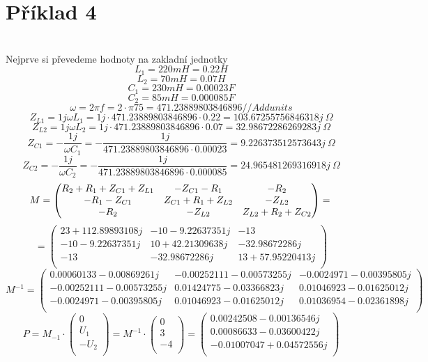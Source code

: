 \section{Příklad 4}
\\
Nejprve si převedeme hodnoty na zakladní jednotky\\
\[
  L_1 = 220 mH = 0.22 H
\]
\[
  L_2 = 70 mH = 0.07 H
\]
\[
  C_1 = 230 mH = 0.00023 F
\]
\[
  C_2 = 85 mH = 0.000085 F
\]
\[
  \omega = 2\pi f 
  = 2 \cdot \pi 75
  = 471.23889803846896 // Add units 
\]
\[
  Z_{L1} = 1j \omega L_1
  = 1j \cdot 471.23889803846896 \cdot 0.22 
  = 103.67255756846318j\ \Omega
\]
\[
  Z_{L2} = 1j \omega L_2
  = 1j \cdot 471.23889803846896 \cdot 0.07 
  = 32.98672286269283j \ \Omega
\]
\[
  Z_{C1} = -\displaystyle\frac{1j}{\omega C_1}
  = - \displaystyle\frac{1j}{471.23889803846896 \cdot 0.00023}
  = 9.226373512573643j\ \Omega
\]
\[
  Z_{C2} = -\displaystyle\frac{1j}{\omega C_2}
  = - \displaystyle\frac{1j}{471.23889803846896 \cdot 0.000085}
  = 24.965481269316918j\ \Omega
\]
\[
  M =
  \begin{pmatrix}
    R_2+R_1+Z_{C1}+Z_{L1} & -Z_{C1}-R_1 & -R_2\\
    -R_1-Z_{C1} & Z_{C1}+R_1+Z_{L2} & -Z_{L2}\\
    -R_2 & -Z_{L2} & Z_{L2}+R_2+Z_{C2}\\
  \end{pmatrix}
  =\\
\]
\[
  =
  \begin{pmatrix}
    23+112.89893108j & -10 -9.22637351j & -13\\
    -10 -9.22637351j & 10 +42.21309638j & -32.98672286j\\
    -13 & -32.98672286j & 13 +57.95220413j\\
  \end{pmatrix}
\]
\[
  M^{-1}
  =
  \begin{pmatrix}
    0.00060133-0.00869261j & -0.00252111-0.00573255j & -0.0024971 -0.00395805j\\
    -0.00252111-0.00573255j & 0.01424775-0.03366823j & 0.01046923-0.01625012j\\
    -0.0024971 -0.00395805j & 0.01046923-0.01625012j & 0.01036954-0.02361898j\\
  \end{pmatrix}
\]
\[
P = M_{-1} \cdot 
\begin{pmatrix}
  0\\
  U_1\\
  -U_2\\
\end{pmatrix}
= M^{-1}\cdot
\begin{pmatrix}
  0\\
  3\\
  -4\\
\end{pmatrix}
= 
\begin{pmatrix}
  0.00242508 -0.00136546j\\
  0.00086633 -0.03600422j\\
  -0.01007047 +0.04572556j\\
\end{pmatrix}
\]
